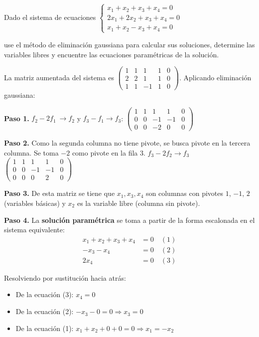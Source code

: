 \begin{example}
Dado el sistema de ecuaciones $\begin{cases}
x_1+x_2+x_3+x_4=0\\
2x_1+2x_2+x_3+x_4=0\\
x_1+x_2-x_3+x_4=0
\end{cases}$

use el método de eliminación gaussiana para calcular sus soluciones, determine las variables libres y encuentre las ecuaciones paramétricas de la solución.

\begin{myproof} La matriz aumentada del sistema es 
$\left(\begin{array}{cccc|c}
1 & 1 & 1 & 1 & 0 \\
2 & 2 & 1 & 1 & 0 \\
1 & 1 & -1 & 1 & 0
\end{array}\right).$ Aplicando eliminación gaussiana:

\textbf{Paso 1.} $f_2 - 2f_1\ \to f_2$ y $f_3 - f_1\to f_3$: $\left(\begin{array}{cccc|c}
1 & 1 & 1 & 1 & 0 \\
0 & 0 & -1 & -1 & 0 \\
0 & 0 & -2 & 0 & 0
\end{array}\right)$

\textbf{Paso 2.} Como la segunda columna no tiene pivote, se busca pivote en la tercera columna. Se toma $-2$ como pivote en la fila 3. $f_3 - 2f_2\to f_3$
$\left(\begin{array}{cccc|c}
\boxed{1} & 1 & 1 & 1 & 0 \\
0 & 0 & \boxed{-1} & -1 & 0 \\
0 & 0 & 0 & \boxed{2} & 0
\end{array}\right)$

\textbf{Paso 3.} De esta matriz se tiene que $x_1, x_3, x_4$ son columnas con pivotes  $1$, $-1$, $2$ (variables básicas) y $x_2$ es la variable libre (columna sin pivote).

\textbf{Paso 4.} La \textbf{solución paramétrica} se toma a partir de la forma escalonada en el sistema equivalente:
\begin{align*}
x_1 + x_2 + x_3 + x_4 &= 0 \quad (1)\\
-x_3 - x_4 &= 0 \quad (2)\\
2x_4 &= 0 \quad (3)
\end{align*}

Resolviendo por sustitución hacia atrás: 
\begin{itemize}
\item De la ecuación (3): $x_4 = 0$
\item De la ecuación (2): $-x_3 - 0 = 0 \Rightarrow x_3 = 0$
\item De la ecuación (1): $x_1 + x_2 + 0 + 0 = 0 \Rightarrow x_1 = -x_2$
\end{itemize}


\end{myproof}
\end{example}

